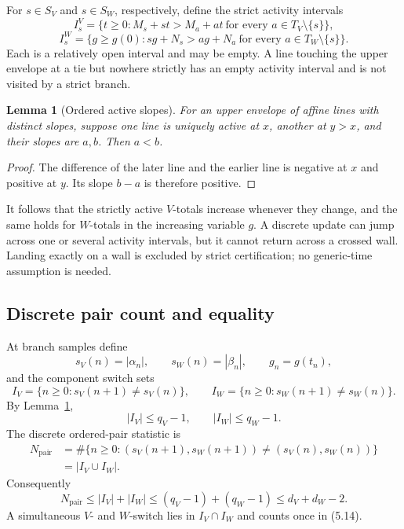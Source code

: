 \documentclass[11pt]{article}
\newtheorem{lemma}[theorem]{Lemma}
\theoremstyle{definition}
\theoremstyle{remark}
\begin{document}
For \(s\in S_V\) and \(s\in S_W\), respectively, define the strict activity
intervals
\[
 I_s^V=
 \{t\geq0:M_s+st>M_a+at\ \text{for every }a\in T_V\setminus\{s\}\},
\tag{5.10}
\]
\[
 I_s^W=
 \{g\geq g(0):sg+N_s>ag+N_a\
      \text{for every }a\in T_W\setminus\{s\}\}.
\tag{5.11}
\]
Each is a relatively open interval and may be empty.  A line touching the
upper envelope at a tie but nowhere strictly has an empty activity interval
and is not visited by a strict branch.

\begin{lemma}[Ordered active slopes]
\label{lem:ordered-slopes}
For an upper envelope of affine lines with distinct slopes, suppose one line
is uniquely active at \(x\), another at \(y>x\), and their slopes are
\(a,b\).  Then \(a<b\).
\end{lemma}

\begin{proof}
The difference of the later line and the earlier line is negative at \(x\)
and positive at \(y\).  Its slope \(b-a\) is therefore positive.
\end{proof}

It follows that the strictly active \(V\)-totals increase whenever they
change, and the same holds for \(W\)-totals in the increasing variable
\(g\).  A discrete update can jump across one or several activity
intervals, but it cannot return across a crossed wall.  Landing exactly on
a wall is excluded by strict certification; no generic-time assumption is
needed.

\subsection{Discrete pair count and equality}

At branch samples define
\[
 s_V(n)=|\alpha_n|,\qquad s_W(n)=|\beta_n|,\qquad g_n=g(t_n),
\]
and the component switch sets
\[
 I_V=\{n\geq0:s_V(n+1)\neq s_V(n)\},\qquad
 I_W=\{n\geq0:s_W(n+1)\neq s_W(n)\}.
\tag{5.12}
\]
By Lemma~\ref{lem:ordered-slopes},
\[
 |I_V|\leq q_V-1,\qquad |I_W|\leq q_W-1.
\tag{5.13}
\]
The discrete ordered-pair statistic is
\[
\begin{aligned}
 N_{\mathrm{pair}}
 &=\#\{n\geq0:
 (s_V(n+1),s_W(n+1))\neq(s_V(n),s_W(n))\}\\
 &=|I_V\cup I_W|.
\end{aligned}
\tag{5.14}
\]
Consequently
\[
 N_{\mathrm{pair}}
 \leq |I_V|+|I_W|
 \leq(q_V-1)+(q_W-1)
 \leq d_V+d_W-2.
\tag{5.15}
\]
A simultaneous \(V\)- and \(W\)-switch lies in \(I_V\cap I_W\) and counts
once in (5.14).
\end{document}
